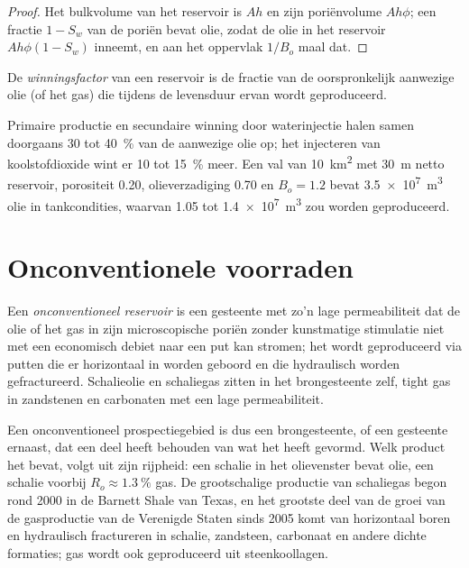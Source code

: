 \begin{proof}
Het bulkvolume van het reservoir is $Ah$ en zijn poriënvolume $Ah\phi$; een fractie $1 - S_w$ van de
poriën bevat olie, zodat de olie in het reservoir $Ah\phi(1 - S_w)$ inneemt, en aan het oppervlak $1/B_o$ maal
dat.
\end{proof}

\begin{definition}[Winningsfactor]\label{def:b2:energy-geology:volumetrics}
De \emph{winningsfactor} van een reservoir is de fractie van de oorspronkelijk aanwezige olie (of het
gas) die tijdens de levensduur ervan wordt geproduceerd.
\end{definition}

Primaire productie en secundaire winning door waterinjectie halen samen doorgaans 30 tot \qty{40}{\percent} van de aanwezige olie op; het injecteren van
koolstofdioxide wint er 10 tot \qty{15}{\percent} meer. Een val van \qty{10}{km^2} met \qty{30}{m} netto
reservoir, porositeit 0.20, olieverzadiging 0.70 en $B_o = 1.2$ bevat \qty{3.5e7}{m^3} olie in
tankcondities, waarvan 1.05 tot \qty{1.4e7}{m^3} zou worden geproduceerd.

\section{Onconventionele voorraden}\label{sec:b2:energy-geology:unconventional}

\begin{definition}\label{def:b2:energy-geology:unconventional}
Een \emph{onconventioneel reservoir} is een gesteente met zo'n lage
permeabiliteit dat de olie of het gas in zijn microscopische poriën zonder kunstmatige stimulatie niet met een economisch
debiet naar een put kan stromen; het wordt geproduceerd via putten die er horizontaal in worden geboord en die
hydraulisch worden gefractureerd. Schalieolie en schaliegas zitten in het brongesteente zelf, tight gas in
zandstenen en carbonaten met een lage permeabiliteit.
\end{definition}

Een onconventioneel prospectiegebied is dus een brongesteente, of een gesteente ernaast, dat een deel heeft behouden van wat het
heeft gevormd. Welk product het bevat, volgt uit zijn rijpheid: een schalie in het olievenster bevat olie,
een schalie voorbij $R_o \approx \qty{1.3}{\percent}$ gas. De grootschalige productie van schaliegas begon rond
2000 in de Barnett Shale van Texas, en het grootste deel van de groei van de gasproductie van de Verenigde Staten sinds
2005 komt van horizontaal boren en hydraulisch fractureren in schalie, zandsteen, carbonaat en
andere dichte formaties; gas wordt ook geproduceerd uit steenkoollagen.

